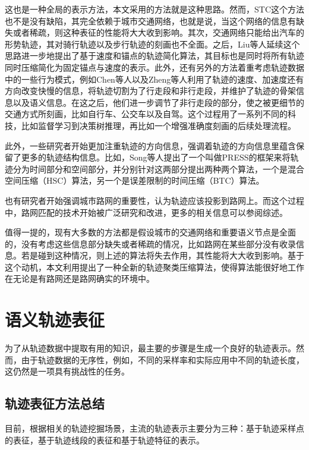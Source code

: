 这也是一种全局的表示方法，本文采用的方法就是这种思路。然而，STC这个方法也不是没有缺陷，其完全依赖于城市交通网络，也就是说，当这个网络的信息有缺失或者稀疏，则这种表征的性能将大大收到影响。其次，交通网络只能给出汽车的形势轨迹，其对骑行轨迹以及步行轨迹的刻画也不全面。之后，Liu等人延续这个思路进一步地提出了基于速度和锚点的轨迹简化算法，其目标也是同时将所有轨迹同时压缩简化为固定锚点与速度的表示。此外，还有另外的方法着重考虑轨迹数据中的一些行为模式，例如Chen等人以及Zheng等人利用了轨迹的速度、加速度还有方向改变快慢的信息，将轨迹切割为了行走段和非行走段，并维护了轨迹的骨架信息以及语义信息。在这之后，他们进一步调节了非行走段的部分，使之被更细节的交通方式所刻画，比如自行车、公交车以及自驾。这个过程用了一系列不同的科技，比如监督学习到决策树推理，再比如一个增强准确度刻画的后续处理流程。

此外，一些研究者开始更加注重轨迹的方向信息，强调着轨迹的方向信息里蕴含保留了更多的轨迹结构信息。比如，Song等人提出了一个叫做PRESS的框架来将轨迹分为时间部分和空间部分，并分别针对这两部分提出两种两个算法，一个是混合空间压缩（HSC）算法，另一个是误差限制的时间压缩（BTC）算法。

也有研究者开始强调城市路网的重要性，认为轨迹应该投影到路网上。而这个过程中，路网匹配的技术开始被广泛研究和改进，更多的相关信息可以参阅综述。

值得一提的，现有大多数的方法都是假设城市的交通网络和重要语义节点是全面的，没有考虑这些信息部分缺失或者稀疏的情况，比如路网在某些部分没有收录信息。若是碰到这种情况，则上述的算法将失去作用，其性能将大大收到影响。基于这个动机，本文利用提出了一种全新的轨迹聚类压缩算法，使得算法能很好地工作在无论是有路网还是路网确实的环境中。

\section{语义轨迹表征}

为了从轨迹数据中提取有用的知识，最主要的步骤是生成一个良好的轨迹表示。然而，由于轨迹数据的无序性，例如，不同的采样率和实际应用中不同的轨迹长度，这仍然是一项具有挑战性的任务。

\subsection{轨迹表征方法总结}
目前，根据相关的轨迹挖掘场景，主流的轨迹表示主要分为三种：基于轨迹采样点的表征，基于轨迹线段的表征和基于轨迹特征的表示。

